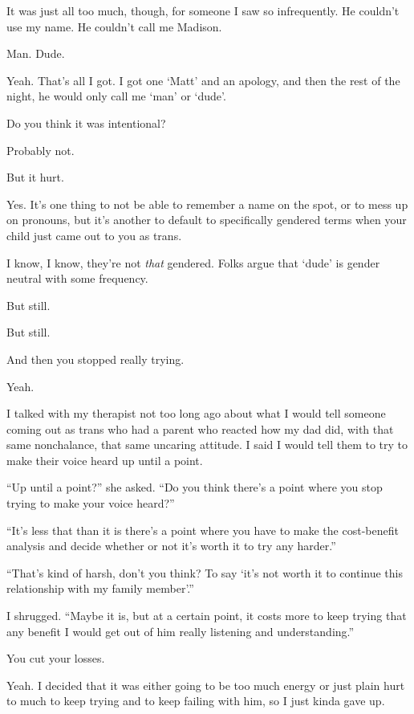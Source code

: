 \begin{paracol}{2}
\begin{leftcolumn}
It was just all too much, though, for someone I saw so infrequently. He couldn't use my name. He couldn't call me Madison.

\begin{ally}
Man. Dude.
\end{ally}
Yeah. That's all I got. I got one `Matt' and an apology, and then the rest of the night, he would only call me `man' or `dude'.

\begin{ally}
Do you think it was intentional?
\end{ally}
Probably not.

\begin{ally}
But it hurt.
\end{ally}
Yes. It's one thing to not be able to remember a name on the spot, or to mess up on pronouns, but it's another to default to specifically gendered terms when your child just came out to you as trans.

I know, I know, they're not \emph{that} gendered. Folks argue that `dude' is gender neutral with some frequency.

\begin{ally}
But still.
\end{ally}
But still.

\begin{ally}
And then you stopped really trying.
\end{ally}
Yeah.

I talked with my therapist not too long ago about what I would tell someone coming out as trans who had a parent who reacted how my dad did, with that same nonchalance, that same uncaring attitude. I said I would tell them to try to make their voice heard up until a point.

``Up until a point?'' she asked. ``Do you think there's a point where you stop trying to make your voice heard?''

``It's less that than it is there's a point where you have to make the cost-benefit analysis and decide whether or not it's worth it to try any harder.''

``That's kind of harsh, don't you think? To say `it's not worth it to continue this relationship with my family member'.''

I shrugged. ``Maybe it is, but at a certain point, it costs more to keep trying that any benefit I would get out of him really listening and understanding.''

\begin{ally}
You cut your losses.
\end{ally}
Yeah. I decided that it was either going to be too much energy or just plain hurt to much to keep trying and to keep failing with him, so I just kinda gave up.


\end{leftcolumn}
\end{paracol}
